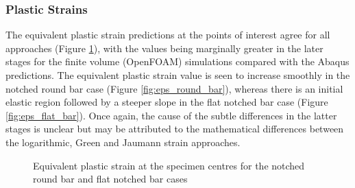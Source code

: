\documentclass[sn-mathphys,Numbered]{sn-jnl}%
\begin{document}
\subsubsection{Plastic Strains}

The equivalent plastic strain predictions at the points of interest agree for all approaches (Figure \ref{fig:eqPlasticStrainPlasticity}), with the values being marginally greater in the later stages for the finite volume (OpenFOAM) simulations compared with the Abaqus predictions.
The equivalent plastic strain value is seen to increase smoothly in the notched round bar case (Figure \ref{fig:eps_round_bar}), whereas there is an initial elastic region followed by a steeper slope in the flat notched bar case (Figure \ref{fig:eps_flat_bar}).
Once again, the cause of the subtle differences in the latter stages is unclear but may be attributed to the mathematical differences between the logarithmic, Green and Jaumann strain approaches.
\begin{figure}[htbp]
	\centering
	\caption{Equivalent plastic strain at the specimen centres for the notched round bar and flat notched bar cases}
	\label{fig:eqPlasticStrainPlasticity}
\end{figure}
\end{document}

